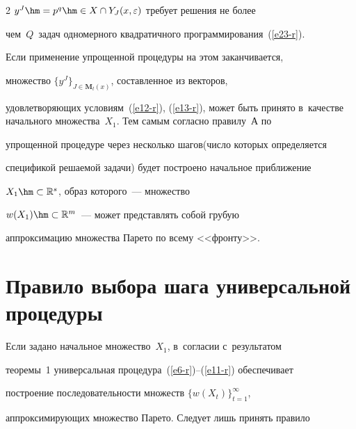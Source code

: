 \begin{multicols}{2}
$y^J\hm= p^q\hm\in X\cap Y_J(x,\varepsilon)$ требует решения не более 


чем~$Q$~задач одномерного квадратичного программирования~(\ref{e23-r}).





  Если применение упрощенной процедуры на этом заканчивается, 


множество $\{ y^J\}_{J\in \mathbf{M}_t(x)}$, составленное из векторов, 


удовлетворяющих условиям~(\ref{e12-r}), (\ref{e13-r}), может быть принято в~качестве начального множества~$X_1$. Тем самым согласно правилу~А по 


упрощенной процедуре через несколько шагов\linebreak (число которых определяется 


спецификой ре\-ша\-емой задачи) будет построено начальное приближение 


$X_1\hm\subset \mathbb{R}^s$, образ которого~--- множество 


$w(X_1)\hm\subset \mathbb{R}^m$~--- может представлять собой грубую 


\mbox{аппроксимацию} множества Парето по всему <<фронту>>.





\vspace*{-6pt}





  


\section{Правило выбора шага универсальной процедуры}





\vspace*{-3pt}








  Если задано начальное множество~$X_1$, в~согласии с~результатом 


теоремы~1 универсальная процедура~(\ref{e6-r})--(\ref{e11-r}) обеспечивает 


построение последовательности множеств $\{ w(X_t)\}^\infty_{t=1}$, 


аппроксимирующих множество Парето. Следует лишь принять правило 



\end{multicols}
